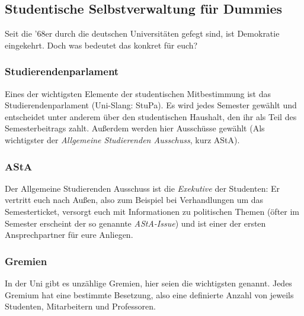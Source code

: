 	\subsection*{Studentische Selbstverwaltung für Dummies}
		Seit die '68er durch die deutschen Universitäten gefegt sind, ist Demokratie eingekehrt. Doch was bedeutet das konkret für euch?

	\subsubsection*{Studierendenparlament}
		Eines der wichtigsten Elemente der studentischen Mitbestimmung ist das Studierendenparlament (Uni-Slang: StuPa). Es wird jedes Semester gewählt und entscheidet unter anderem über den studentischen Haushalt, den ihr als Teil des Semesterbeitrags zahlt. Außerdem werden hier Ausschüsse gewählt (Als wichtigster der \emph{Allgemeine Studierenden Ausschuss}, kurz AStA).

	\subsubsection*{AStA}
		Der Allgemeine Studierenden Ausschuss ist die \emph{Exekutive} der Studenten: Er vertritt euch nach Außen, also zum Beispiel bei Verhandlungen um das Semesterticket, versorgt euch mit Informationen zu politischen Themen (öfter im Semester erscheint der so genannte \emph{AStA-Issue}) und ist einer der ersten Ansprechpartner für eure Anliegen.

	\subsubsection*{Gremien}
		In der Uni gibt es unzählige Gremien, hier seien die wichtigsten genannt. Jedes Gremium hat eine bestimmte Besetzung, also eine definierte Anzahl von jeweils Studenten, Mitarbeitern und Professoren.

